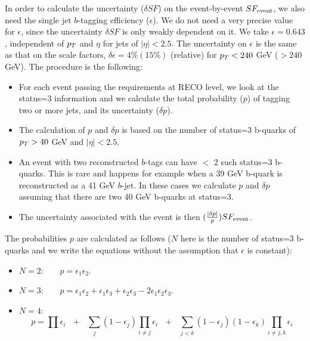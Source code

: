 In order to calculate the uncertainty ($\delta SF$) on the event-by-event $SF_{\rm event}$,
we also need the single jet $b$-tagging efficiency ($\epsilon$).  
We do not need a very precise value for $\epsilon$, since the uncertainty $\delta SF$ is 
only weakly dependent on it.  We take $\epsilon = 0.643$, independent of $p_T$
and $\eta$ for jets of $|\eta| < 2.5$.  The uncertainty on $\epsilon$ is 
the same as that on the scale factors, $\delta \epsilon = 4\% (15\%)$ (relative)
for $p_T < 240$ GeV ($> 240$ GeV).
The procedure is the following:
\begin{itemize}

\item For each event passing the requirements at RECO level, we look at the status=3 information
and we calculate the total probability ($p$) of tagging two or more jets, and 
its uncertainty ($\delta p$).

\item The calculation of $p$ and $\delta p$ is based on the number of status=3 b-quarks
of $p_T > 40$ GeV and $|\eta| < 2.5$.  

\item An event with two reconstructed $b$-tags can have $<$ 2 such status=3 b-quarks.  This 
is rare and happens for example when a 39 GeV b-quark is reconstructed as a 41 GeV
$b$-jet.  In these cases we calculate $p$ and $\delta p$ assuming that there are 
two 40 GeV b-quarks at status=3.

\item The uncertainty associated with the event is then $(\frac{|\delta p|}{p}) SF_{\rm event}$.

\end{itemize}

The probabilities $p$ are calculated as follows ($N$ here is the number of status=3 b-quarks
and we write the equations without the assumption that $\epsilon$ is constant):

\begin{itemize}

\item $N=2$:~~~~$p = \epsilon_1 \epsilon_2$.

\item $N=3$:~~~~$p = \epsilon_1 \epsilon_2 + \epsilon_1 \epsilon_3 + \epsilon_2 \epsilon_3 -
2\epsilon_1 \epsilon_2 \epsilon_3$.

\item $N=4$:~~~~$$p = \prod{\epsilon_i}~~~+~~~\sum_j{(1-\epsilon_j)\prod_{i \ne j}{\epsilon_i}}
~~~+~~~\sum_{j<k}{(1-\epsilon_j)(1-\epsilon_k)\prod_{i \ne j,k}{\epsilon_i}}$$



\end{itemize}

